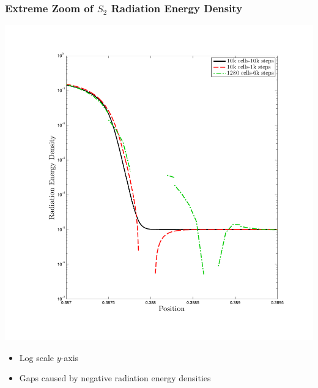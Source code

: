 \documentclass{beamer}
\begin{document}
\begin{frame}
\frametitle{Extreme Zoom of $S_2$ Radiation Energy Density}
\begin{center}
\includegraphics[height=0.7\textheight,trim=1.5in  0.8in 1.1in 1.0in,clip=true]{../chapter6_grey_radtran/Dissertation_Data/Zoom_10k_Phi.pdf}
\end{center}
\begin{itemize}
\item Log scale $y$-axis
\item Gaps caused by negative radiation energy densities
\end{itemize}
\end{frame}
\end{document}
